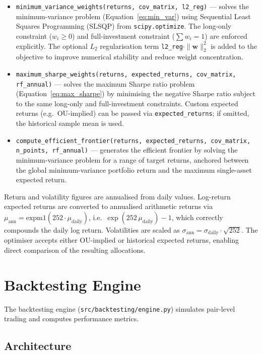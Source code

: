 \documentclass[a4paper]{report}
\begin{document}
\begin{itemize}
    \item \texttt{minimum\_variance\_weights(returns, cov\_matrix, l2\_reg)} --- solves the minimum-variance problem (Equation~\ref{eq:min_var}) using Sequential Least Squares Programming (SLSQP) from \texttt{scipy.optimize}. The long-only constraint ($w_i \geq 0$) and full-investment constraint ($\sum w_i = 1$) are enforced explicitly. The optional $L_2$ regularisation term \texttt{l2\_reg}$\cdot \|\mathbf{w}\|_2^2$ is added to the objective to improve numerical stability and reduce weight concentration.
    \item \texttt{maximum\_sharpe\_weights(returns, expected\_returns, cov\_matrix, rf\_annual)} --- solves the maximum Sharpe ratio problem (Equation~\ref{eq:max_sharpe}) by minimising the negative Sharpe ratio subject to the same long-only and full-investment constraints. Custom expected returns (e.g.\ OU-implied) can be passed via \texttt{expected\_returns}; if omitted, the historical sample mean is used.
    \item \texttt{compute\_efficient\_frontier(returns, expected\_returns, cov\_matrix, n\_points, rf\_annual)} --- generates the efficient frontier by solving the minimum-variance problem for a range of target returns, anchored between the global minimum-variance portfolio return and the maximum single-asset expected return.
\end{itemize}

Return and volatility figures are annualised from daily values. Log-return expected returns are converted to annualised arithmetic returns via $\mu_{\text{ann}} = \mathrm{expm1}(252 \cdot \mu_{\text{daily}})$, i.e.\ $\exp(252\,\mu_{\text{daily}}) - 1$, which correctly compounds the daily log return. Volatilities are scaled as $\sigma_{\text{ann}} = \sigma_{\text{daily}} \cdot \sqrt{252}$. The optimiser accepts either OU-implied or historical expected returns, enabling direct comparison of the resulting allocations.

\section{Backtesting Engine}

The backtesting engine (\texttt{src/backtesting/engine.py}) simulates pair-level trading and computes performance metrics.

\subsection{Architecture}
\end{document}

